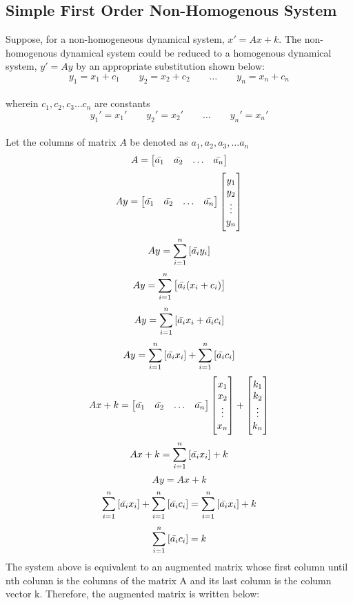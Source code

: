 \documentclass[a4paper, 12pt]{report}
\begin{document}
\begin{center}
\section{Simple First Order Non-Homogenous System}
\begin{comment}
\end{comment}
Suppose, for a non-homogeneous dynamical system, $x' = Ax + k$. The non-homogenous dynamical system could be reduced to a homogenous dynamical system, $y' = Ay$ by an appropriate substitution shown below:  
$$y_1 = x_1 + c_1 \qquad y_2 = x_2 + c_2 \qquad \dots \qquad y_n = x_n + c_n $$
\\wherein $c_1, c_2, c_3 \dots c_n$ are constants
$$y_1' = x_1' \qquad y_2' = x_2' \qquad \dots \qquad y_n' = x_n'$$
\\Let the columns of matrix $A$ be denoted as $a_1, a_2, a_3,\dots a_n$
$$A = \begin{bmatrix} \bar{a_1} & \bar{a_2} &\dots & \bar{a_n} \end{bmatrix}$$
$$Ay = \begin{bmatrix} \bar{a_1} & \bar{a_2} &\dots & \bar{a_n} \end{bmatrix} \begin{bmatrix}y_1 \\ y_2 \\ \vdots \\ y_n \end{bmatrix}$$
$$Ay = \sum_{i = 1} ^ {n} \left[\bar{a_i}y_i\right]$$
$$Ay = \sum_{i = 1} ^ {n} \left[\bar{a_i}(x_i +c_i)\right]$$
$$Ay = \sum_{i = 1} ^ {n} \left[\bar{a_i}x_i + \bar{a_i}c_i\right]$$
$$Ay = \sum_{i = 1} ^ {n} \left[\bar{a_i}x_i\right] + \sum_{i = 1} ^ {n} \left[\bar{a_i}c_i\right]$$
$$Ax + k= \begin{bmatrix} \bar{a_1} & \bar{a_2} &\dots & \bar{a_n} \end{bmatrix} \begin{bmatrix}x_1 \\ x_2 \\ \vdots \\ x_n \end{bmatrix} + \begin{bmatrix} k_1 \\k_2 \\\vdots \\k_n\end{bmatrix}$$
$$Ax + k = \sum_{i = 1}^{n} \left[\bar{a_i}x_i\right] + k$$
$$Ay = Ax + k$$
$$\sum_{i = 1} ^ {n} \left[\bar{a_i}x_i\right] + \sum_{i = 1} ^ {n} \left[\bar{a_i}c_i\right] = \sum_{i = 1}^{n} \left[\bar{a_i}x_i\right] + k$$
$$\sum_{i = 1} ^ {n} \left[\bar{a_i}c_i\right] =  k$$
The system above is equivalent to an augmented matrix whose first column until nth column is the columns of the matrix A and its last column is the column vector k. Therefore, the augmented matrix is written below:

\end{center}
\end{document}
